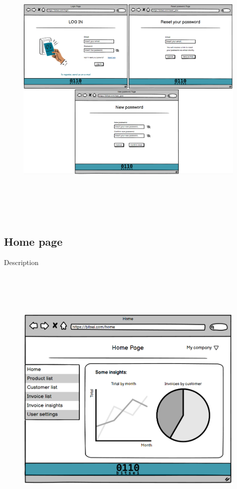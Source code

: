\begin{figure}[h!]
    \centering
    \includegraphics[height=390pt, keepaspectratio]{resources/mockup/Login.png}
\end{figure}
\newpage
\subsection{Home page}

Description


\begin{figure}[h!]
    \centering
    \includegraphics[height=380pt, keepaspectratio]{resources/mockup/Home.png}
\end{figure}
\newpage
